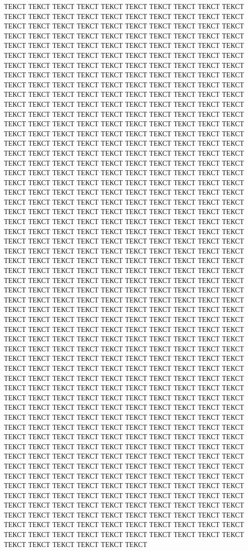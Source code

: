 ТЕКСТ ТЕКСТ ТЕКСТ ТЕКСТ ТЕКСТ ТЕКСТ ТЕКСТ ТЕКСТ ТЕКСТ ТЕКСТ ТЕКСТ ТЕКСТ ТЕКСТ ТЕКСТ ТЕКСТ ТЕКСТ ТЕКСТ ТЕКСТ ТЕКСТ ТЕКСТ ТЕКСТ ТЕКСТ ТЕКСТ ТЕКСТ ТЕКСТ ТЕКСТ ТЕКСТ ТЕКСТ ТЕКСТ ТЕКСТ ТЕКСТ ТЕКСТ ТЕКСТ ТЕКСТ ТЕКСТ ТЕКСТ ТЕКСТ ТЕКСТ ТЕКСТ ТЕКСТ ТЕКСТ ТЕКСТ ТЕКСТ ТЕКСТ ТЕКСТ ТЕКСТ ТЕКСТ ТЕКСТ ТЕКСТ ТЕКСТ ТЕКСТ ТЕКСТ ТЕКСТ ТЕКСТ ТЕКСТ ТЕКСТ ТЕКСТ ТЕКСТ ТЕКСТ ТЕКСТ ТЕКСТ ТЕКСТ ТЕКСТ ТЕКСТ ТЕКСТ ТЕКСТ ТЕКСТ ТЕКСТ ТЕКСТ ТЕКСТ ТЕКСТ ТЕКСТ ТЕКСТ ТЕКСТ ТЕКСТ ТЕКСТ ТЕКСТ ТЕКСТ ТЕКСТ ТЕКСТ ТЕКСТ ТЕКСТ ТЕКСТ ТЕКСТ ТЕКСТ ТЕКСТ ТЕКСТ ТЕКСТ ТЕКСТ ТЕКСТ ТЕКСТ ТЕКСТ ТЕКСТ ТЕКСТ ТЕКСТ ТЕКСТ ТЕКСТ ТЕКСТ ТЕКСТ ТЕКСТ ТЕКСТ ТЕКСТ ТЕКСТ ТЕКСТ ТЕКСТ ТЕКСТ ТЕКСТ ТЕКСТ ТЕКСТ ТЕКСТ ТЕКСТ ТЕКСТ ТЕКСТ ТЕКСТ ТЕКСТ ТЕКСТ ТЕКСТ ТЕКСТ ТЕКСТ ТЕКСТ ТЕКСТ ТЕКСТ ТЕКСТ ТЕКСТ ТЕКСТ ТЕКСТ ТЕКСТ ТЕКСТ ТЕКСТ ТЕКСТ ТЕКСТ ТЕКСТ ТЕКСТ ТЕКСТ ТЕКСТ ТЕКСТ ТЕКСТ ТЕКСТ ТЕКСТ ТЕКСТ ТЕКСТ ТЕКСТ ТЕКСТ ТЕКСТ ТЕКСТ ТЕКСТ ТЕКСТ ТЕКСТ ТЕКСТ ТЕКСТ ТЕКСТ ТЕКСТ ТЕКСТ ТЕКСТ ТЕКСТ ТЕКСТ ТЕКСТ ТЕКСТ ТЕКСТ ТЕКСТ ТЕКСТ ТЕКСТ ТЕКСТ ТЕКСТ ТЕКСТ ТЕКСТ ТЕКСТ ТЕКСТ ТЕКСТ ТЕКСТ ТЕКСТ ТЕКСТ ТЕКСТ ТЕКСТ ТЕКСТ ТЕКСТ ТЕКСТ ТЕКСТ ТЕКСТ ТЕКСТ ТЕКСТ ТЕКСТ ТЕКСТ ТЕКСТ ТЕКСТ ТЕКСТ ТЕКСТ ТЕКСТ ТЕКСТ ТЕКСТ ТЕКСТ ТЕКСТ ТЕКСТ ТЕКСТ ТЕКСТ ТЕКСТ ТЕКСТ ТЕКСТ ТЕКСТ ТЕКСТ ТЕКСТ ТЕКСТ ТЕКСТ ТЕКСТ ТЕКСТ ТЕКСТ ТЕКСТ ТЕКСТ ТЕКСТ ТЕКСТ ТЕКСТ ТЕКСТ ТЕКСТ ТЕКСТ ТЕКСТ ТЕКСТ ТЕКСТ ТЕКСТ ТЕКСТ ТЕКСТ ТЕКСТ ТЕКСТ ТЕКСТ ТЕКСТ ТЕКСТ ТЕКСТ ТЕКСТ ТЕКСТ ТЕКСТ ТЕКСТ ТЕКСТ ТЕКСТ ТЕКСТ ТЕКСТ ТЕКСТ ТЕКСТ ТЕКСТ ТЕКСТ ТЕКСТ ТЕКСТ ТЕКСТ ТЕКСТ ТЕКСТ ТЕКСТ ТЕКСТ ТЕКСТ ТЕКСТ ТЕКСТ ТЕКСТ ТЕКСТ ТЕКСТ ТЕКСТ ТЕКСТ ТЕКСТ ТЕКСТ ТЕКСТ ТЕКСТ ТЕКСТ ТЕКСТ ТЕКСТ ТЕКСТ ТЕКСТ ТЕКСТ ТЕКСТ ТЕКСТ ТЕКСТ ТЕКСТ ТЕКСТ ТЕКСТ ТЕКСТ ТЕКСТ ТЕКСТ ТЕКСТ ТЕКСТ ТЕКСТ ТЕКСТ ТЕКСТ ТЕКСТ ТЕКСТ ТЕКСТ ТЕКСТ ТЕКСТ ТЕКСТ ТЕКСТ ТЕКСТ ТЕКСТ ТЕКСТ ТЕКСТ ТЕКСТ ТЕКСТ ТЕКСТ ТЕКСТ ТЕКСТ ТЕКСТ ТЕКСТ ТЕКСТ ТЕКСТ ТЕКСТ ТЕКСТ ТЕКСТ ТЕКСТ ТЕКСТ ТЕКСТ ТЕКСТ ТЕКСТ ТЕКСТ ТЕКСТ ТЕКСТ ТЕКСТ ТЕКСТ ТЕКСТ ТЕКСТ ТЕКСТ ТЕКСТ ТЕКСТ ТЕКСТ ТЕКСТ ТЕКСТ ТЕКСТ ТЕКСТ ТЕКСТ ТЕКСТ ТЕКСТ ТЕКСТ ТЕКСТ ТЕКСТ ТЕКСТ ТЕКСТ ТЕКСТ ТЕКСТ ТЕКСТ ТЕКСТ ТЕКСТ ТЕКСТ ТЕКСТ ТЕКСТ ТЕКСТ ТЕКСТ ТЕКСТ ТЕКСТ ТЕКСТ ТЕКСТ ТЕКСТ ТЕКСТ ТЕКСТ ТЕКСТ ТЕКСТ ТЕКСТ ТЕКСТ ТЕКСТ ТЕКСТ ТЕКСТ ТЕКСТ ТЕКСТ ТЕКСТ ТЕКСТ ТЕКСТ ТЕКСТ ТЕКСТ ТЕКСТ ТЕКСТ ТЕКСТ ТЕКСТ ТЕКСТ ТЕКСТ ТЕКСТ ТЕКСТ ТЕКСТ ТЕКСТ ТЕКСТ ТЕКСТ ТЕКСТ ТЕКСТ ТЕКСТ ТЕКСТ ТЕКСТ ТЕКСТ ТЕКСТ ТЕКСТ ТЕКСТ ТЕКСТ ТЕКСТ ТЕКСТ ТЕКСТ ТЕКСТ ТЕКСТ ТЕКСТ ТЕКСТ ТЕКСТ ТЕКСТ ТЕКСТ ТЕКСТ ТЕКСТ ТЕКСТ ТЕКСТ ТЕКСТ ТЕКСТ ТЕКСТ ТЕКСТ ТЕКСТ ТЕКСТ ТЕКСТ ТЕКСТ ТЕКСТ ТЕКСТ ТЕКСТ ТЕКСТ ТЕКСТ ТЕКСТ ТЕКСТ ТЕКСТ ТЕКСТ ТЕКСТ ТЕКСТ ТЕКСТ ТЕКСТ ТЕКСТ ТЕКСТ ТЕКСТ ТЕКСТ ТЕКСТ ТЕКСТ ТЕКСТ ТЕКСТ ТЕКСТ ТЕКСТ ТЕКСТ ТЕКСТ ТЕКСТ ТЕКСТ ТЕКСТ ТЕКСТ ТЕКСТ ТЕКСТ ТЕКСТ ТЕКСТ ТЕКСТ ТЕКСТ ТЕКСТ ТЕКСТ ТЕКСТ ТЕКСТ ТЕКСТ ТЕКСТ ТЕКСТ ТЕКСТ ТЕКСТ ТЕКСТ ТЕКСТ ТЕКСТ ТЕКСТ ТЕКСТ ТЕКСТ ТЕКСТ ТЕКСТ ТЕКСТ ТЕКСТ ТЕКСТ ТЕКСТ ТЕКСТ ТЕКСТ ТЕКСТ ТЕКСТ ТЕКСТ ТЕКСТ ТЕКСТ ТЕКСТ ТЕКСТ ТЕКСТ ТЕКСТ ТЕКСТ ТЕКСТ ТЕКСТ ТЕКСТ ТЕКСТ ТЕКСТ ТЕКСТ ТЕКСТ ТЕКСТ ТЕКСТ ТЕКСТ ТЕКСТ ТЕКСТ ТЕКСТ ТЕКСТ ТЕКСТ ТЕКСТ ТЕКСТ ТЕКСТ ТЕКСТ ТЕКСТ ТЕКСТ ТЕКСТ ТЕКСТ ТЕКСТ ТЕКСТ ТЕКСТ ТЕКСТ ТЕКСТ ТЕКСТ ТЕКСТ ТЕКСТ ТЕКСТ ТЕКСТ ТЕКСТ ТЕКСТ ТЕКСТ ТЕКСТ ТЕКСТ ТЕКСТ ТЕКСТ ТЕКСТ ТЕКСТ ТЕКСТ ТЕКСТ ТЕКСТ ТЕКСТ ТЕКСТ ТЕКСТ ТЕКСТ ТЕКСТ ТЕКСТ ТЕКСТ ТЕКСТ ТЕКСТ ТЕКСТ ТЕКСТ ТЕКСТ ТЕКСТ ТЕКСТ ТЕКСТ ТЕКСТ ТЕКСТ ТЕКСТ ТЕКСТ ТЕКСТ ТЕКСТ ТЕКСТ ТЕКСТ ТЕКСТ ТЕКСТ ТЕКСТ ТЕКСТ ТЕКСТ ТЕКСТ ТЕКСТ ТЕКСТ ТЕКСТ ТЕКСТ ТЕКСТ ТЕКСТ ТЕКСТ ТЕКСТ ТЕКСТ ТЕКСТ ТЕКСТ

